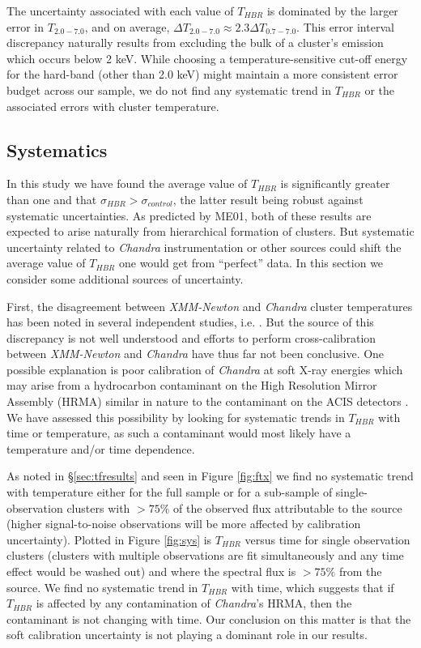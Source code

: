 \documentclass{emulateapj}
\begin{document}
The uncertainty associated with each value of $T_{HBR}$ is dominated by
the larger error in $T_{2.0-7.0}$, and on average, $\Delta T_{2.0-7.0} \approx
2.3\Delta T_{0.7-7.0}$. This error interval discrepancy naturally results
from excluding the bulk of a cluster's emission which occurs below 2
keV. While choosing a temperature-sensitive cut-off energy for the
hard-band (other than 2.0 keV) might maintain a more consistent
error budget across our sample, we do not find any systematic trend in
$T_{HBR}$ or the associated errors with cluster temperature.

\subsection{Systematics} \label{sec:sys}

In this study we have found the average value of $T_{HBR}$ is significantly
greater than one and that $\sigma_{HBR} > \sigma_{control}$, the
latter result being robust against systematic uncertainties. As
predicted by ME01, both of these results are expected to arise
naturally from hierarchical formation of clusters. But systematic
uncertainty related to {\it Chandra} instrumentation or other sources could
shift the average value of $T_{HBR}$ one would get from ``perfect'' data. In
this section we consider some additional sources of uncertainty.

First, the disagreement between {\it XMM-Newton} and {\it Chandra}
cluster temperatures has been noted in several independent studies,
i.e. \citealt{2005ApJ...628..655V,chanxmmdis}. But the source of this
discrepancy is not well understood and efforts to perform
cross-calibration between {\it XMM-Newton} and {\it Chandra} have thus
far not been conclusive. One possible explanation is poor calibration
of {\it Chandra} at soft X-ray energies which may arise from a
hydrocarbon contaminant on the High Resolution Mirror Assembly (HRMA)
similar in nature to the contaminant on the ACIS detectors
\citep{aciscontaminant}. We have assessed this possibility by looking
for systematic trends in $T_{HBR}$ with time or temperature, as such a
contaminant would most likely have a temperature and/or time
dependence.

As noted in \S\ref{sec:tfresults} and seen in Figure \ref{fig:ftx} we
find no systematic trend with temperature either for the full sample
or for a sub-sample of single-observation clusters with $> 75\%$ of
the observed flux attributable to the source (higher signal-to-noise
observations will be more affected by calibration
uncertainty). Plotted in Figure \ref{fig:sys} is $T_{HBR}$ versus time
for single observation clusters (clusters with multiple observations
are fit simultaneously and any time effect would be washed out) and
where the spectral flux is $> 75\%$ from the source. We find no
systematic trend in $T_{HBR}$ with time, which suggests that if
$T_{HBR}$ is affected by any contamination of {\it Chandra}'s HRMA,
then the contaminant is not changing with time. Our conclusion on this
matter is that the soft calibration uncertainty is not playing a
dominant role in our results.
\end{document}
